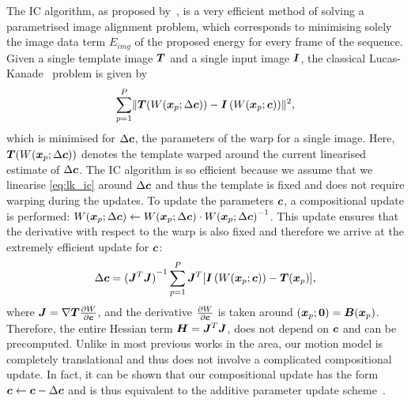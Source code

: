 The IC algorithm, as proposed by~\cite{baker2004lucas}, is a very efficient method of solving
a parametrised image alignment problem, which corresponds to minimising solely the image data
term $E_{img}$ of the proposed energy for every frame of the sequence. Given a single
template image $\boldsymbol{T}$ and a single input image $\boldsymbol{I}$, the classical
Lucas-Kanade~\cite{lucas1981iterative} problem is given by
\begin{equation}\label{eq:lk_ic}
    \sum_{p=1}^P  \lVert{} 
                         \boldsymbol{T}(W(\boldsymbol{x}_p;\Delta \boldsymbol{c})) -
                         \boldsymbol{I}\left( W(\boldsymbol{x}_p;\boldsymbol{c}) \right)
                         \rVert^2,
\end{equation}
which is minimised for $\Delta \boldsymbol{c}$, the parameters of the warp for a single image.
Here, $\boldsymbol{T}(W(\boldsymbol{x}_p;\Delta \boldsymbol{c}))$ denotes
the template warped around the current linearised estimate of $\Delta \boldsymbol{c}$.
The IC algorithm is so efficient because we assume that we
linearise \cref{eq:lk_ic} around $\Delta \boldsymbol{c}$ and thus the template
is fixed and does not require warping during the updates. To update the parameters
$\boldsymbol{c}$, a compositional update is performed:
$W(\boldsymbol{x}_p;\Delta \boldsymbol{c}) \leftarrow W(\boldsymbol{x}_p;\Delta \boldsymbol{c}) \cdot {W(\boldsymbol{x}_p;\Delta \boldsymbol{c})}^{-1}$.
This update ensures that the derivative with respect to the warp is also fixed
and therefore we arrive at the extremely efficient update for $\boldsymbol{c}$:
\begin{equation}\label{eq:lk_ic_update}
    \Delta \boldsymbol{c} = {(\boldsymbol{J}^T \boldsymbol{J})}^{-1} \sum_{p=1}^P \boldsymbol{J}^T [\boldsymbol{I}\left( W(\boldsymbol{x}_p;\boldsymbol{c}) \right) - \boldsymbol{T}(\boldsymbol{x}_p)],
\end{equation}
where $\boldsymbol{J} = \nabla \boldsymbol{T} \frac{\partial W}{\partial \boldsymbol{c}}$,
and the derivative $\frac{\partial W}{\partial \boldsymbol{c}}$ is
taken around $(\boldsymbol{x}_p;\boldsymbol{0}) = \boldsymbol{B}(\boldsymbol{x}_p)$. Therefore,
the entire Hessian term $\boldsymbol{H} = \boldsymbol{J}^T \boldsymbol{J}$, does not depend
on $\boldsymbol{c}$ and can be precomputed.
Unlike in most previous works in the area, our motion model is completely
translational and thus does not involve a complicated compositional update.
In fact, it can be shown that our compositional update
has the form $\boldsymbol{c} \leftarrow \boldsymbol{c} - \Delta \boldsymbol{c}$ and is thus equivalent to the
additive parameter update scheme~\cite{amberg2009compositional}.

